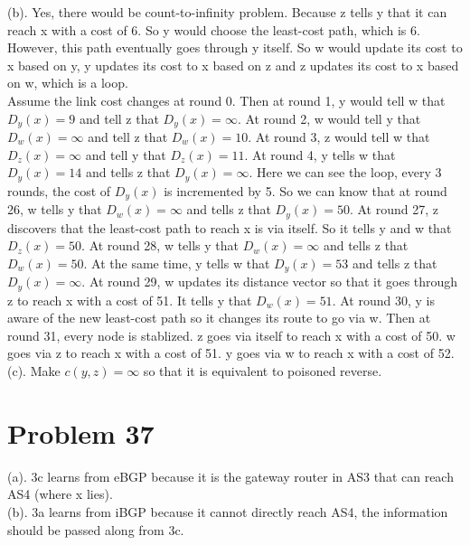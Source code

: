 \documentclass[titlepage, paper=a4, fontsize=11pt]{scrartcl} %
\numberwithin{equation}{section} %
\numberwithin{table}{section} %
\begin{document}
(b).
Yes, there would be count-to-infinity problem. Because z tells y that it can reach x with a cost of 6. So y would choose the least-cost path, which is 6. However, this path eventually goes through y itself. So w would update its cost to x based on y, y updates its cost to x based on z and z updates its cost to x based on w, which is a loop. \\
Assume the link cost changes at round 0. Then at round 1, y would tell w that $D_y(x) = 9$ and tell z that $D_y(x)=\infty$. At round 2, w would tell y that $D_w(x) = \infty$ and tell z that $D_w(x) = 10$. At round 3, z would tell w that $D_z(x) = \infty$ and tell y that $D_z(x)=11$. At round 4, y tells w that $D_y(x)=14$ and tells z that $D_y(x)=\infty$. Here we can see the loop, every 3 rounds, the cost of $D_y(x)$ is incremented by 5. So we can know that at round 26, w tells y that $D_w(x) = \infty$ and tells z that $D_y(x)=50$. At round 27, z discovers that the least-cost path to reach x is via itself. So it tells y and w that $D_z(x) = 50$. At round 28, w tells y that $D_w(x)=\infty$ and tells z that $D_w(x)=50$. At the same time, y tells w that $D_y(x)=53$ and tells z that $D_y(x)=\infty$. At round 29, w updates its distance vector so that it goes through z to reach x with a cost of 51. It tells y that $D_w(x)=51$. At round 30, y is aware of the new least-cost path so it changes its route to go via w. Then at round 31, every node is stablized. z goes via itself to reach x with a cost of 50. w goes via z to reach x with a cost of 51. y goes via w to reach x with a cost of 52. \\

(c).
Make $c(y, z) = \infty$ so that it is equivalent to poisoned reverse. \\





\section*{Problem 37}
(a).
3c learns from eBGP because it is the gateway router in AS3 that can reach AS4 (where x lies). \\

(b).
3a learns from iBGP because it cannot directly reach AS4, the information should be passed along from 3c. \\
\end{document}
